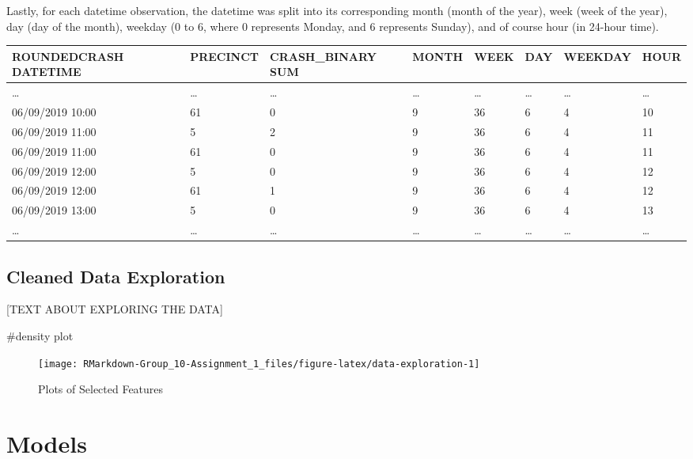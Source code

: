 Lastly, for each datetime observation, the datetime was split into its
corresponding month (month of the year), week (week of the year), day
(day of the month), weekday (0 to 6, where 0 represents Monday, and 6
represents Sunday), and of course hour (in 24-hour time).

\begin{longtable}[]{@{}llllllll@{}}
\toprule
ROUNDEDCRASH DATETIME & PRECINCT & CRASH\_BINARY SUM & MONTH & WEEK &
DAY & WEEKDAY & HOUR\tabularnewline
\midrule
\endhead
\ldots{} & \ldots{} & \ldots{} & \ldots{} & \ldots{} & \ldots{} &
\ldots{} & \ldots{}\tabularnewline
06/09/2019 10:00 & 61 & 0 & 9 & 36 & 6 & 4 & 10\tabularnewline
06/09/2019 11:00 & 5 & 2 & 9 & 36 & 6 & 4 & 11\tabularnewline
06/09/2019 11:00 & 61 & 0 & 9 & 36 & 6 & 4 & 11\tabularnewline
06/09/2019 12:00 & 5 & 0 & 9 & 36 & 6 & 4 & 12\tabularnewline
06/09/2019 12:00 & 61 & 1 & 9 & 36 & 6 & 4 & 12\tabularnewline
06/09/2019 13:00 & 5 & 0 & 9 & 36 & 6 & 4 & 13\tabularnewline
\ldots{} & \ldots{} & \ldots{} & \ldots{} & \ldots{} & \ldots{} &
\ldots{} & \ldots{}\tabularnewline
\bottomrule
\end{longtable}

\hypertarget{cleaned-data-exploration}{%
\subsection{Cleaned Data Exploration}\label{cleaned-data-exploration}}

{[}TEXT ABOUT EXPLORING THE DATA{]}

\#density plot

\begin{Schunk}
\begin{figure}

{\centering \texttt{[image: RMarkdown-Group\_10-Assignment\_1\_files/figure-latex/data-exploration-1]} 

}

\caption[Plots of Selected Features]{Plots of Selected Features}\label{fig:data-exploration}
\end{figure}
\end{Schunk}

\begin{Schunk}
\end{Schunk}

\hypertarget{models}{%
\section{Models}\label{models}}

